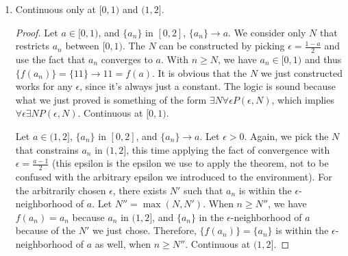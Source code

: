 \documentclass{article}
\newtheorem{lemma}{Lemma}
\begin{document}
\begin{enumerate}
\begin{enumerate}[label=\alph*.]
\begin{proof}
    \begin{lemma}
      If $\{a_n\}$ is in $\mathbb{N}$ and converges to $k$, there
      exists $N$ such that $a_n = k$ for all $n \geq N$.  for
      $n \geq N$
    \end{lemma}
    \begin{proof}
      This is also quite obvious. We've already proved $k$ is a
      natural number. Choose $\epsilon$ to be $1$, there's will be a
      corresponding $N$ value. There is no integer in $(k-1,k)$ and
      $(k,k+1)$, so when $n \geq N$, all $a_n$ equals $k$.
    \end{proof}

    Just realized the first lemma is redundant while typesetting
    :(

    Let $k \in \mathbb{N}$, and $\{a_n\}$ be any sequence in $\mathbb{N}$ that
    converges to $k$.

    By the second lemma we just proved, $\exists N$ such that $a_n =
    k$ for all $n \geq N$. Therefore, we have $f(a_n)=f(k)$ for all $n
    \geq N$. For any $\epsilon>0$, we always pick this $N$, as
    $f(a_n)$ will always belongs to the singleton set $\{f(k)\}$ which
    is a proper subset of any $\epsilon$-neighborhood of $f(k)$.
  \end{proof}
    
  \end{enumerate}
\item Continuous only at $[0,1)$ and $(1,2]$.
  \begin{proof}
    Let $a \in [0,1)$, and $\{a_n\}$ in $[0,2]$, $\{a_n\}\rightarrow
    a$. We consider only $N$ that restricts $a_n$ between $[0,1)$. The
    $N$ can be constructed by picking $\epsilon = \frac{1-a}{2}$ and
    use the fact that $a_n$ converges to $a$. With
    $n \geq N$, we have $a_n \in [0,1)$ and thus
    $\{f(a_n)\} = \{11\} \rightarrow 11 = f(a)$. It is obvious that
    the $N$ we just constructed works for any $\epsilon$, since it's
    always just a constant. The logic is sound because  what we
    just proved is something of the form $\exists N \forall \epsilon
    P(\epsilon, N)$, which implies $\forall \epsilon \exists N
    P(\epsilon, N)$.
    Continuous at
    $[0,1)$.

    Let $a \in (1,2]$, $\{a_n\}$ in $[0,2]$, and $\{a_n\}\rightarrow
    a$.
    Let $\epsilon > 0$. Again, we pick the $N$ that constrains $a_n$
    in $(1,2]$, this time applying the fact of convergence with $\epsilon
    = \frac{a-1}{2}$ (this epsilon is the epsilon we use to apply the
    theorem, not to be confused with the arbitrary epsilon we
    introduced to the environment). For the arbitrarily chosen
    $\epsilon$, there exists $N'$ such that $a_n$ is within the
    $\epsilon$-neighborhood of $a$. Let $N'' = \max(N,N')$. When $n
    \geq N''$, we have $f(a_n) = a_n$ because $a_n$ in $(1,2]$, and
    $\{a_n\}$ in the $\epsilon$-neighborhood of $a$ because of the $N'$ we just
    chose. Therefore, 
    $\{f(a_n)\}= \{a_n\}$ is within the $\epsilon$-neighborhood of $a$
    as well, when $n \geq N''$. Continuous at
    $(1,2]$.


\end{proof}
\end{enumerate}
\end{document}
